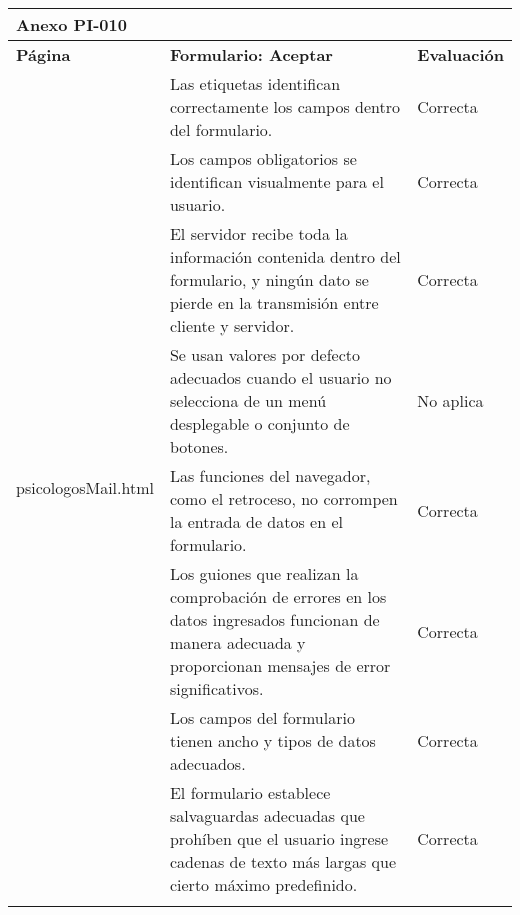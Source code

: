 \begin{table}[htpb]
\centering
\begin{tabularx}{\textwidth}{|l|X|l|}
\hline
\multicolumn{3}{|l|}{\textbf{Anexo PI-010}}                                                                                                                                                                              \\ \hline
\textbf{Página}                       & \textbf{Formulario: Aceptar}                                                                                                                              & \textbf{Evaluación} \\ \hline
\multirow{10}{*}{psicologosMail.html} & Las etiquetas identifican correctamente los campos dentro del formulario.                                                                                 & Correcta            \\ \cline{2-3} 
                                      & Los campos obligatorios se identifican visualmente para el usuario.                                                                                       & Correcta            \\ \cline{2-3} 
                                      & El servidor recibe toda la información contenida dentro del formulario, y ningún dato se pierde en la transmisión entre cliente y servidor.               & Correcta            \\ \cline{2-3} 
                                      & Se usan valores por defecto adecuados cuando el usuario no selecciona de un menú desplegable o conjunto de botones.                                       & No aplica           \\ \cline{2-3} 
                                      & Las funciones del navegador, como el retroceso, no corrompen la entrada de datos en el formulario.                                                        & Correcta            \\ \cline{2-3} 
                                      & Los guiones que realizan la comprobación de errores en los datos ingresados funcionan de manera adecuada y proporcionan mensajes de error significativos. & Correcta            \\ \cline{2-3} 
                                      & Los campos del formulario tienen ancho y tipos de datos adecuados.                                                                                        & Correcta            \\ \cline{2-3} 
                                      & El formulario establece salvaguardas adecuadas que prohíben que el usuario ingrese cadenas de texto más largas que cierto máximo predefinido.             & Correcta            \\ \cline{2-3} 

\end{tabularx}
\end{table}
